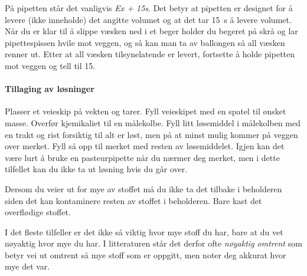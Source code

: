 \documentclass[hidelinks,12pt,norsk,a4paper,fleqn]{scrartcl}
\begin{document}
	På pipetten står det vanligvis \emph{Ex + 15s}. Det betyr at pipetten er designet for å levere (ikke inneholde) det angitte volumet og at det tar \SI{15}{s} å levere volumet. Når du er klar til å slippe væsken ned i et beger holder du begeret på skrå og lar pipettespissen hvile mot veggen, og så kan man ta av ballongen så all væsken renner ut. Etter at all væsken tilsynelatende er levert, fortsette å holde pipetten mot veggen og tell til 15. 
	
	\paragraph{Tillaging av løsninger}
	Plasser et veieskip på vekten og tarer. Fyll veieskipet med en spatel til ønsket masse. Overfør kjemikaliet til en målekolbe. Fyll litt løsemiddel i målekolben med en trakt og rist forsiktig til alt er løst, men på at minst mulig kommer på veggen over merket. Fyll så opp til merket med resten av løsemiddelet. Igjen kan det være lurt å bruke en pasteurpipette når du nærmer deg merket, men i dette tilfellet kan du ikke ta ut løsning hvis du går over.
	
	Dersom du veier ut for mye av stoffet må du ikke ta det tilbake i beholderen siden det kan kontaminere resten av stoffet i beholderen. Bare kast det overflødige stoffet.
	
	I det fleste tilfeller er det ikke så viktig hvor mye stoff du har, bare at du vet nøyaktig hvor mye du har. I litteraturen står det derfor ofte \emph{nøyaktig omtrent} som betyr vei ut omtrent så mye stoff som er oppgitt, men noter deg akkurat hvor mye det var.
	
\end{document}
